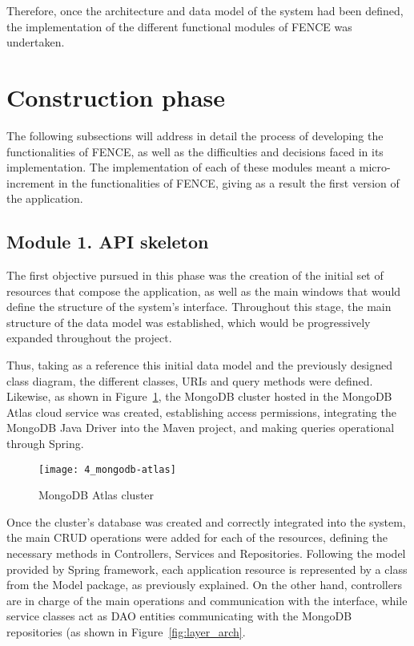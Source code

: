 Therefore, once the architecture and data model of the system had been defined, the implementation of the different functional modules of FENCE was undertaken.

\section{Construction phase}

The following subsections will address in detail the process of developing the functionalities of FENCE, as well as the difficulties and decisions faced in its implementation. The implementation of each of these modules meant a micro-increment in the functionalities of FENCE, giving as a result the first version of the application.

\subsection{Module 1. API skeleton}

The first objective pursued in this phase was the creation of the initial set of resources that compose the application, as well as the main windows that would define the structure of the system's interface. Throughout this stage, the main structure of the data model was established, which would be progressively expanded throughout the project.

Thus, taking as a reference this initial data model and the previously designed class diagram, the different classes, URIs and query methods were defined. Likewise, as shown in Figure~\ref{fig:mongodb-cluster}, the MongoDB cluster hosted in the MongoDB Atlas cloud service was created, establishing access permissions, integrating the MongoDB Java Driver into the Maven project, and making queries operational through Spring.

\begin{figure}
	\centering
	\texttt{[image: 4\_mongodb-atlas]}
	\caption[MongoDB Atlas cluster]{MongoDB Atlas cluster}
	\label{fig:mongodb-cluster}
\end{figure}

Once the cluster’s database was created and correctly integrated into the system, the main CRUD operations were added for each of the resources, defining the necessary methods in Controllers, Services and Repositories. Following the model provided by Spring framework, each application resource is represented by a class from the Model package, as previously explained. On the other hand, controllers are in charge of the main operations and communication with the interface, while service classes act as DAO entities communicating with the MongoDB repositories (as shown in Figure~\ref{fig:layer_arch}.

